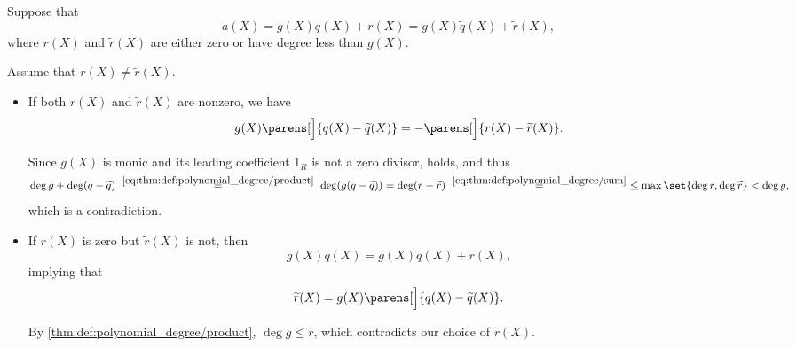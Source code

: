 \begin{defproof}
  \UniquenessSubProof Suppose that
  \begin{equation*}
    a(X) = g(X)q(X) + r(X) = g(X) \widetilde{q}(X) + \widetilde{r}(X),
  \end{equation*}
  where \( r(X) \) and \( \widetilde{r}(X) \) are either zero or have degree less than \( g(X) \).

  Assume that \( r(X) \neq \widetilde{r}(X) \).

  \begin{itemize}
    \item If both \( r(X) \) and \( \widetilde{r}(X) \) are nonzero, we have
    \begin{equation*}
      g(X) \parens[\Big]{ q(X) - \widetilde{q}(X) } = -\parens[\Big]{ r(X) - \widetilde{r}(X) }.
    \end{equation*}

    Since \( g(X) \) is monic and its leading coefficient \( 1_R \) is not a zero divisor,  holds, and thus
    \begin{equation*}
      \deg g + \deg(q - \widetilde{q})
      \reloset {\eqref{eq:thm:def:polynomial_degree/product}} =
      \deg(g (q - \widetilde{q}))
      =
      \deg(r - \widetilde{r})
      \reloset {\eqref{eq:thm:def:polynomial_degree/sum}} =
      \leq \max\set{ \deg r, \deg \widetilde{r} }
      <
      \deg g,
    \end{equation*}
    which is a contradiction.

    \item If \( r(X) \) is zero but \( \widetilde{r}(X) \) is not, then
    \begin{equation*}
      g(X) q(X) = g(X) \widetilde{q}(X) + \widetilde{r}(X),
    \end{equation*}
    implying that
    \begin{equation*}
      \widetilde{r}(X) = g(X) \parens[\Big]{ q(X) - \widetilde{q}(X) }.
    \end{equation*}

    By \eqref{thm:def:polynomial_degree/product}, \( \deg g \leq \widetilde{r} \), which contradicts our choice of \( \widetilde{r}(X) \).
  \end{itemize}
\end{defproof}

